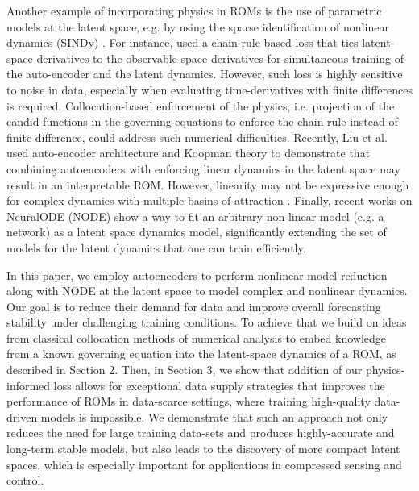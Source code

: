         Another example of incorporating physics in ROMs is the use of parametric models at the latent space, e.g. by using the sparse identification of nonlinear dynamics (SINDy) \cite{brunton2016discovering,champion2019data}. For instance, \cite{fries2022lasdi,he2022glasdi} used a chain-rule based loss that ties latent-space derivatives to the observable-space derivatives for simultaneous training of the auto-encoder and the latent dynamics. However, such loss is highly sensitive to noise in data, especially when evaluating time-derivatives with finite differences is required\cite{delahunt2022sindynoise}. 
        Collocation-based enforcement of the physics, i.e. projection of the candid functions in the governing equations to enforce the chain rule instead of finite difference, could address such numerical difficulties. Recently, Liu et al. \cite{liu2022physics} used auto-encoder architecture and Koopman theory to demonstrate that combining autoencoders with enforcing linear dynamics in the latent space may result in an interpretable ROM. However, linearity may not be expressive enough for complex dynamics with multiple basins of attraction \cite{page2019koopman}.
        Finally, recent works on NeuralODE (NODE) \cite{chen2018neuralode,rackauckas2020udes} show a way to fit an arbitrary non-linear model (e.g. a network) as a latent space dynamics model, significantly extending the set of models for the latent dynamics that one can train efficiently. 
        
        In this paper, we employ autoencoders to perform nonlinear model reduction along with NODE at the latent space to model complex and nonlinear dynamics. Our goal is to reduce their demand for data and improve overall forecasting stability under challenging training conditions. To achieve that we build on ideas from classical collocation methods of numerical analysis to embed knowledge from a known governing equation into the latent-space dynamics of a ROM, as described in Section 2. Then, in Section 3, we show that addition of our physics-informed loss allows for exceptional data supply strategies that improves the performance of ROMs in data-scarce settings, where training high-quality data-driven models is impossible. We demonstrate that such an approach not only reduces the need for large training data-sets and produces highly-accurate and long-term stable models, but also leads to the discovery of more compact latent spaces, which is especially important for applications in compressed sensing and control.

